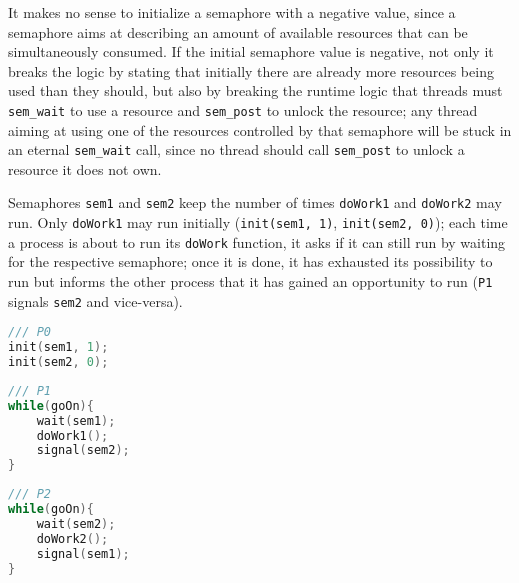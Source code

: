 \documentclass{sope}
\begin{document}
{
It makes no sense to initialize a semaphore with a negative value, since a semaphore aims at describing an amount of available resources that can be simultaneously consumed. If the initial semaphore value is negative, not only it breaks the logic by stating that initially there are already more resources being used than they should, but also by breaking the runtime logic that threads must \texttt{sem\_wait} to use a resource and \texttt{sem\_post} to unlock the resource; any thread aiming at using one of the resources controlled by that semaphore will be stuck in an eternal \texttt{sem\_wait} call, since no thread should call \texttt{sem\_post} to unlock a resource it does not own.

Semaphores \texttt{sem1} and \texttt{sem2} keep the number of times \texttt{doWork1} and \texttt{doWork2} may run. Only \texttt{doWork1} may run initially (\texttt{init(sem1, 1)}, \texttt{init(sem2, 0)}); each time a process is about to run its \texttt{doWork} function, it asks if it can still run by waiting for the respective semaphore; once it is done, it has exhausted its possibility to run but informs the other process that it has gained an opportunity to run (\texttt{P1} signals \texttt{sem2} and vice-versa).
\begin{lstlisting}[language=C]
/// P0
init(sem1, 1);
init(sem2, 0);
\end{lstlisting}
\begin{center}
\begin{minipage}{0.47\textwidth}\begin{lstlisting}[language=C]
/// P1
while(goOn){
    wait(sem1);
    doWork1();
    signal(sem2);
}
\end{lstlisting} \end{minipage} \hspace{2em}
\begin{minipage}{0.47\textwidth} \begin{lstlisting}[language=C]
/// P2
while(goOn){
    wait(sem2);
    doWork2();
    signal(sem1);
}
\end{lstlisting} \end{minipage}
\end{center}


}
\end{document}
